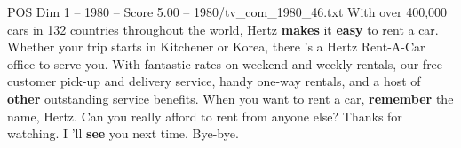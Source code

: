 \begin{textsample}{POS Dim 1 – 1980 – Score 5.00 – 1980/tv\_com\_1980\_46.txt}  \label{ex:f1_pos_044}
With over 400,000 cars in 132 countries throughout the world, Hertz \textbf{makes} it \textbf{easy} to rent a car.
Whether your trip starts in Kitchener or Korea, there 's a Hertz Rent-A-Car office to serve you.
With fantastic rates on weekend and weekly rentals, our free customer pick-up and delivery service, handy one-way rentals, and a host of \textbf{other} outstanding service benefits.
When you want to rent a car, \textbf{remember} the name, Hertz.
Can you really afford to rent from anyone else?
Thanks for watching.
I 'll \textbf{see} you next time.
Bye-bye.

\end{textsample}
